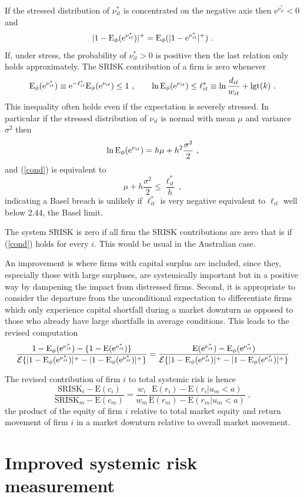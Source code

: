 \documentclass[authoryear]{elsarticle}
\newcommand{\logit}{\mathrm{lgt}}
\newcommand{\E}{\mathrm{E}}
\newcommand{\e}{\mathrm{e}}
\newcommand{\Ex}{{\cal E}}
\newcommand{\eref}[1]{(\ref{#1})}
\newcommand{\cq}{\ , \qquad}
\newcommand{\be}[1]{\begin{equation}\label{#1}}
\newcommand{\ee}{\end{equation}}
\begin{document}
 If the stressed distribution of $\nu^*_{it} $ is concentrated on the negative axis then  $\e^{\nu^*_{it}}<0$ and
$$
|1-\Es(\e^{\nu^*_{it}})|^+ =\Es(|1-\e^{\nu^*_{it}}|^+)\ .
$$
If, under stress, the probability of $\nu^*_{it}>0$ is positive  then the last relation only holds approximately.   The SRISK contribution of a firm is zero whenever
\be{cond}
\Es(\e^{\nu^*_{it}})\equiv \e^{-\ell_{it}^*}\Es(\e^{\nu_{it}})\le 1\cq \ln \Es(\e^{\nu_{it}})\le\ell^*_{it}\equiv\ln\frac{d_{it}}{w_{it}}+\logit(k)\ .
\ee
This inequality often holds even if the expectation is severely stressed.  In particular if the stressed distribution of $\nu_{it}$ is normal with mean $\mu$ and variance $\sigma^2$ then
$$
\ln \Es(\e^{\nu_{it}}) = h\mu +h^2\frac{\sigma^2}{2}\ ,
$$
and  \eref{cond} is equivalent to
$$
\mu +h\frac{\sigma^2}{2}\le \frac{\ell_{it}^*}{h} \ ,
$$
indicating a Basel breach is unlikely if $\ell^*_{it}$ is very negative equivalent to  $\ell_{it}$ well below 2.44, the Basel limit.


The system SRISK is zero if all firm the SRISK contributions are zero that is if \eref{cond} holds for every $i$.  This would be usual in the Australian case.



An improvement is where firms with capital surplus are included, since they, especially those with large surpluses, are systemically important but in a positive way by dampening the impact from distressed firms.  Second, it is  appropriate to consider the departure from the unconditional expectation to differentiate firms which only experience capital shortfall during a market downturn as opposed to those who already have large shortfalls in average conditions.   This leads to the revised computation
$$
\frac{1-\Es(\e^{\nu^*_{it}})-\{1-\E(\e^{\nu^*_{it}})\}}{\Ex\{|1-\Es(\e^{\nu^*_{it}})|^+-|1-\Es(\e^{\nu^*_{it}})|^+\}} = \frac{\E(\e^{\nu^*_{it}})-\Es(\e^{\nu^*_{it}})}{\Ex\{|1-\Es(\e^{\nu^*_{it}})|^+-|1-\Es(\e^{\nu^*_{it}})|^+\}} 
$$


The revised contribution of firm $i$ to total systemic risk is hence
$$
\frac{\mathrm{SRISK}_i-\E(c_i)}{\mathrm{SRISK}_m-\E(c_m)}
=\frac{w_i }{w_m } \frac{\E(r_i)-\E(r_i|u_m<a)}{\E(r_m)-\E(r_m|u_m<a)} \;,
$$
the product of the equity of firm $i$ relative to total market equity and return movement of firm $i$ in a market downturn relative to overall market movement.

\section{Improved systemic risk measurement}
\end{document}
